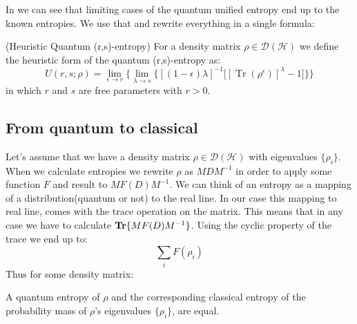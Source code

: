 \noindent
In \citep{hu2006generalized} we can see that limiting cases of the quantum unified entropy end up to the known entropies. We use that and rewrite everything in a single formula:
\begin{definition}(Heuristic Quantum (r,s)-entropy) For a density matrix $\rho \in \mathcal{D}(\mathcal{H})$ we define the heuristic form of the quantum (r,s)-entropy as:
\begin{equation}
U(r,s;\rho)=\lim_{\epsilon \to r}\Big\{ \lim_{\lambda \to s}\big\{ [(1-\epsilon) \lambda]^{-1} \big[ [\operatorname{Tr}(\rho^{\epsilon})]^{\lambda}-1 \big] \big\}  \Big\}
\end{equation}
in which $r$ and $s$ are free parameters with $r>0$.
\end{definition}
\subsection{From quantum to classical}
Let's assume that we have a density matrix $\rho \in \mathcal{D}(\mathcal{H})$ with eigenvalues $\{ \rho_i \}$. When we calculate entropies we rewrite $\rho$ as $MDM^{-1}$ in order to apply some function $F$ and result to $MF(D)M^{-1}$. We can think of an entropy as a mapping of a distribution(quantum or not) to the real line. In our case this mapping to real line, comes with the trace operation on the matrix. This means that in any case we have to calculate $\operatorname{\textup{\textbf{Tr}}} \{MF(D)M^{-1}\}$. Using the cyclic property of the trace we end up to:
\begin{equation}
\sum_i F(\rho_i)
\end{equation}
Thus for some density matrix:
\begin{note}
A quantum entropy of $\rho$ and the corresponding classical entropy of the probability mass of $\rho$'s eigenvalues $\{\rho_i\}$, are equal.
\end{note}
